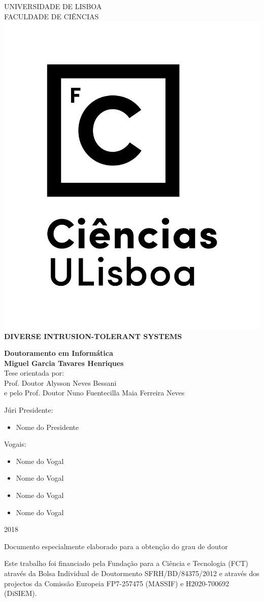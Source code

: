 \documentclass[
 paper=A4,               %
    twoside=true,           %
    openright,              %
    parskip=full,           %
    chapterprefix=true,     %
    11pt,                   %
    headings=normal,        %
    bibliography=totoc,     %
    listof=totoc,           %
    titlepage=on,           %
    captions=tableabove,    %
    draft=false,            %
]{scrreprt}
\theoremstyle{definition}
\newcommand{\TITULO}{DIVERSE INTRUSION-TOLERANT SYSTEMS}
\newcommand{\Autor}{Miguel Garcia Tavares Henriques}
\newcommand{\Orientador}{Alysson Neves Bessani}
\newcommand{\CoOrientador}{Nuno Fuentecilla Maia Ferreira Neves} %
\newcommand{\Ano}{\Large{2018}}
\newcommand{\DOUTORAMENTO}{Doutoramento em Inform\'{a}tica}
\newcommand{\IdiomaTese}{\selectlanguage{english}}
\newcommand{\Especialidade}{}
\newcommand{\Cabecalho}{
\vspace{1cm}\normalfont\normalfont
\vfill
\textsc{\normalsize\uppercase{Universidade de Lisboa}}\\
\normalsize\uppercase{Faculdade de Ci\^{e}ncias}\\
\vspace{1cm}
\includegraphics[scale=.45]{pic/logo_fcul_vertical.png}\\
}
\begin{document}
\begin{center}

\Cabecalho

\vspace{0.5cm}
\vfill
\IdiomaTese
\Large{\textbf{\TITULO}}\\
\vspace{1cm}
\vfill

\large{\textbf{\DOUTORAMENTO}}\\
\vspace{1cm}
\vfill
\Large{\textbf{\Autor}}\\
\vspace{.5 cm}
\vfill
\large{Tese orientada por:}\\
\large{Prof. Doutor \Orientador} \\
e pelo Prof. Doutor \CoOrientador \\
\vspace{.3 cm}
\vfill

\begin{flushleft}  
\large{J\'{u}ri}
\setlength{\leftskip}{0.5cm}
\normalsize{Presidente:}
\begin{itemize}
\item{Nome do Presidente}
\end{itemize}
\normalsize{Vogais:}
\begin{itemize}
\setlength\itemsep{-1 em}
\item{Nome do Vogal}
\item{Nome do Vogal}
\item{Nome do Vogal}
\item{Nome do Vogal}
\end{itemize}
\setlength{\leftskip}{0cm}
\end{flushleft}
\vspace{0.0cm}

\Ano
\end{center}
\newpage
\mbox{}
\newpage

\begin{center}
\normalsize{Documento especialmente elaborado para a obten\c{c}\~{a}o do grau de doutor\par}
\vspace{0.0cm}
\normalsize{Este trabalho foi financiado pela Funda\c{c}\~{a}o para a Ci\^{e}ncia e Tecnologia (FCT) atrav\'{e}s da Bolsa Individual de Doutormento SFRH/BD/84375/2012 e atrav\'{e}s dos projectos da Comiss\~{a}o Europeia FP7-257475 (MASSIF) e H2020-700692 (DiSIEM).}
\vspace{0.cm}
\vfill
\end{center}
\end{document}
